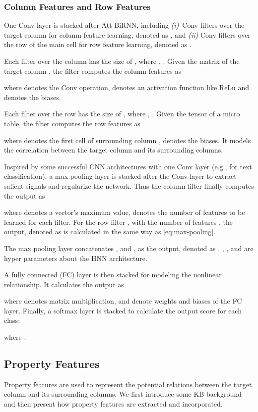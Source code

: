 \documentclass{article}
\begin{document}
\subsubsection{Column Features and Row Features}
One Conv layer is stacked after Att-BiRNN,
including
\textit{(i)}~Conv filters over the target column for column feature learning, denoted as , 
and \textit{(ii)} Conv filters over the row of the main cell for row feature learning, denoted as . 

Each filter over the column  has the size of , where , .
Given the matrix of the target column , 
the filter computes the column features as

where  denotes the Conv operation, 
 denotes an activation function like ReLu
and  denotes the biases.

Each filter over the row 
 has the size of , 
where , .
Given the tensor of a micro table,
the filter computes the row features as 

where  denotes the first cell of surrounding column ,  denotes the biases.
It models the correlation between the target column and its surrounding columns.

Inspired by some successful CNN architectures with one Conv layer (e.g., \cite{kim2014convolutional} for text classification),
a max pooling layer is stacked after the Conv layer to extract salient signals and regularize the network.
Thus the column filter  finally computes the output as

where  denotes a vector's maximum value, 
 denotes the number of features to be learned for each filter.
For the row filter , with the number of features ,
the output,
denoted as  
is calculated in the same way as \eqref{eq:max-pooling}.

The max pooling layer concatenates ,  and ,  as the output, denoted as .
, ,  and  are hyper parameters about the HNN architecture.

A fully connected (FC) layer is then stacked for modeling the nonlinear relationship.
It calculates the output as
\vspace{-0.05cm}

where  denotes matrix multiplication,  
 and  denote weights and biases of the FC layer.
Finally, a softmax layer is stacked to calculate the output score for each class:
\vspace{-0.15cm}

where .

\subsection{Property Features}
Property features are used to represent the potential relations between the target column and its surrounding columns.
We first introduce some KB background 
and then present how property features are extracted and incorporated.
\end{document}
